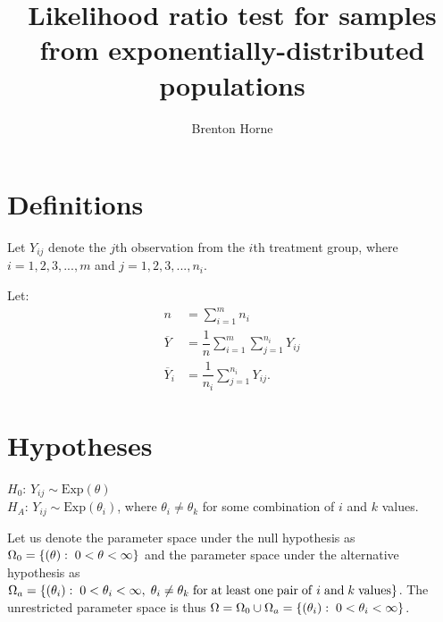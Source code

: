 \documentclass[12pt,a4paper]{article}
\title{Likelihood ratio test for samples from exponentially-distributed populations}
\author{Brenton Horne}
\newcommand{\Exp}{\mathrm{Exp}}
\begin{document}
	\maketitle
	\tableofcontents
	\newpage

    \section{Definitions}
    Let $Y_{ij}$ denote the $j$th observation from the $i$th treatment group, where $i=1, 2, 3, ..., m$ and $j=1, 2, 3, ..., n_i$. 

    Let:
	\begin{align*}
		n &= \sum_{i=1}^m n_i \\
		\overline{Y} &= \dfrac{1}{n} \sum_{i=1}^m \sum_{j=1}^{n_i} Y_{ij} \\
		\overline{Y}_i &= \dfrac{1}{n_i} \sum_{j=1}^{n_i} Y_{ij}.
	\end{align*}

    \section{Hypotheses}
    $H_0$: $Y_{ij} \sim \Exp(\theta)$ \\
    $H_A$: $Y_{ij} \sim \Exp(\theta_i)$, where $\theta_i \neq \theta_k$ for some combination of $i$ and $k$ values.

    Let us denote the parameter space under the null hypothesis as $\Omega_0 = \left\{(\theta): \hspace{0.1cm} 0 < \theta < \infty\right\}$ and the parameter space under the alternative hypothesis as $\Omega_a = \left\{(\theta_i): \hspace{0.1cm} 0 < \theta_i < \infty, \hspace{0.1cm}\theta_i \neq \theta_k \hspace{0.1cm}\mathrm{for}\hspace{0.1cm}\mathrm{at}\hspace{0.1cm}\mathrm{least}\hspace{0.1cm}\mathrm{one}\hspace{0.1cm}\mathrm{pair}\hspace{0.1cm}\mathrm{of}\hspace{0.1cm}i\hspace{0.1cm}\mathrm{and}\hspace{0.1cm}k \hspace{0.1cm}\mathrm{values}\right\}$. The unrestricted parameter space is thus $\Omega = \Omega_0 \cup \Omega_a = \left\{(\theta_i): \hspace{0.1cm} 0 < \theta_i < \infty\right\}$.
\end{document}
